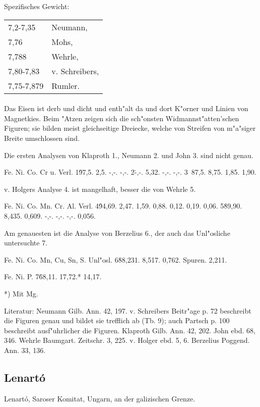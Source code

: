 \documentclass[a4paper, 11pt, oneside]{article}
\begin{document}
Spezifisches Gewicht:  
\begin{table}[!ht]
    \centering
    \begin{tabular}{l l}
        7,2-7,35 & Neumann,\\
        7,76 & Mohs,\\
        7,788 & Wehrle,\\
        7,80-7,83 & v. Schreibers,\\
        7,75-7,879 & Rumler.
    \end{tabular}
\end{table}
\paragraph{}
Das Eisen ist derb und dicht und enth"alt da und dort K"orner und Linien von Magnetkies. Beim "Atzen zeigen sich die sch"onsten Widmannst"atten'schen Figuren; sie bilden meist gleichseitige Dreiecke, welche von Streifen von m"a"siger Breite umschlossen sind.

Die ersten Analysen von Klaproth 1., Neumann 2. und John 3. sind nicht genau.

Fe. Ni. Co. Cr u. Verl.  
1\. 97,5. 2,5. -,-. -,-.  
2\.  -,-. 5,32.  -,-.  -,-.  
3\ 87,5. 8,75. 1,85. 1,90.

v. Holgers Analyse 4. ist mangelhaft, besser die von Wehrle 5.

Fe. Ni. Co. Mn. Cr. Al. Verl.  
4\. 94,69. 2,47. 1,59. 0,88. 0,12. 0,19. 0,06.  
5\. 89,90. 8,435. 0,609. -,-. -,-. -,-. 0,056.

Am genauesten ist die Analyse von Berzelius 6., der auch das Unl"osliche untersuchte 7.

Fe. Ni. Co. Mn, Cu, Sn, S. Unl"osl.  
6\. 88,231. 8,517. 0,762. Spuren. 2,211.

Fe. Ni. P.  
7\. 68,11. 17,72.* 14,17.

*) Mit Mg.

Literatur: Neumann Gilb. Ann. 42, 197. v. Schreibers Beitr"age p. 72 beschreibt die Figuren genau und bildet sie trefflich ab (Tb. 9); auch Partsch p. 100 beschreibt ausf"uhrlicher die Figuren. Klaproth Gilb. Ann. 42, 202. John ebd. 68, 346. Wehrle Baumgart. Zeitschr. 3, 225. v. Holger ebd. 5, 6. Berzelius Poggend. Ann. 33, 136.

\subsection{Lenartó}

Lenartó, Saroser Komitat, Ungarn, an der galizischen Grenze.
\end{document}
